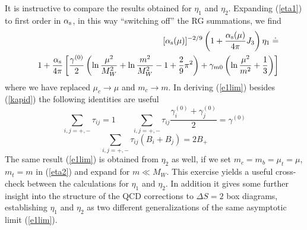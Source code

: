 It is instructive to compare the results obtained for $\eta_1$
and $\eta_2$. Expanding (\ref{eta1}) to first order in $\alpha_{\rm s}$,
in this way ``switching off'' the RG summations, we find
\begin{eqnarray}\label{e1lim}
&&[\alpha_{\rm s}(\mu)]^{-2/9}\left(1+\frac{\alpha_{\rm s}(\mu)}{4\pi}J_3\right)
\eta_1\doteq  \\
&& 1+\frac{\alpha_{\rm s}}{4\pi}\left[\frac{\gamma^{(0)}}{2}\left(
\ln\frac{\mu^2}{M^2_W}+\ln\frac{m^2}{M^2_W}-1+\frac{2}{9}\pi^2\right)
+\gamma_{m0}\left(\ln\frac{\mu^2}{m^2}+\frac{1}{3}\right)\right]
\nonumber
\end{eqnarray}
where we have replaced $\mu_c\to\mu$ and $m_c\to m$. In deriving
(\ref{e1lim}) besides (\ref{kapid}) the following identities are
useful
\begin{equation}\label{tauid}
\sum_{i,j=+,-}\tau_{ij}=1\qquad
\sum_{i,j=+,-}\tau_{ij}\frac{\gamma^{(0)}_i+\gamma^{(0)}_j}{2}=
\gamma^{(0)}
\end{equation}
\begin{equation}\label{bid}
\sum_{i,j=+,-}\tau_{ij}(B_i+B_j)=2 B_+
\end{equation}
The same result (\ref{e1lim}) is obtained from $\eta_2$ as well,
if we set $m_c=m_b=\mu_t=\mu$, $m_t=m$ in (\ref{eta2}) and expand
for $m\ll M_W$. This exercise yields a useful cross-check between
the calculations for $\eta_1$ and $\eta_2$. In addition it gives
some further insight into the structure of the QCD corrections to
$\Delta S=2$ box diagrams, establishing $\eta_1$ and $\eta_2$ as two
different generalizations of the same asymptotic limit (\ref{e1lim}).

